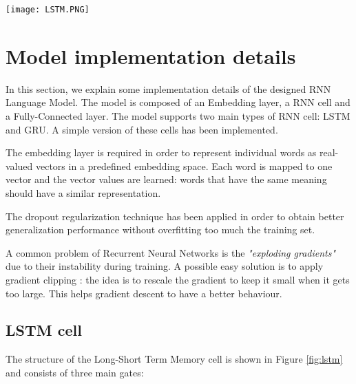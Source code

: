 
\begin{figure*}[t]
\centerline{\texttt{[image: LSTM.PNG]}}
\caption{Long-Short Term Memory cell structure and related equations.} %
\label{fig:lstm}
\end{figure*}

\section{Model implementation details}

In this section, we explain some implementation details of the designed 
RNN Language Model. The model is composed of an Embedding layer, a RNN cell 
and a Fully-Connected layer. The model supports two main types of RNN cell: 
LSTM and GRU. A simple version of these cells has been implemented.

The embedding layer is required in order to represent individual words as
real-valued vectors in a predefined embedding space. Each word is mapped 
to one vector and the vector values are learned: words that have 
the same meaning should have a similar representation.

The dropout regularization technique \cite{dropout} has been applied in order
to obtain better generalization performance without overfitting too much the
training set.

A common problem of Recurrent Neural Networks is the \textit{"exploding gradients"} 
due to their instability during training.
A possible easy solution is to apply gradient clipping \cite{clip}: the idea is to
rescale the gradient to keep it small when it gets too large.
This helps gradient descent to have a better behaviour.

\subsection{LSTM cell}


The structure of the Long-Short Term Memory cell is shown in Figure \ref{fig:lstm}
and consists of three main gates:

